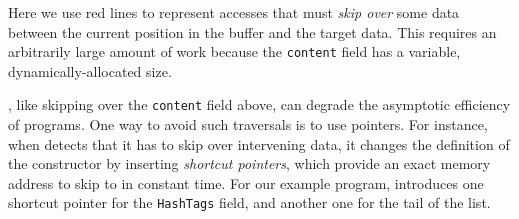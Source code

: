 


%
Here we use red lines to represent accesses that must \emph{skip over} some data
between the current position in the buffer and the target data. 
%
This  requires an arbitrarily large amount of work because
the \lstinline|content| field has a variable, dynamically-allocated size. 


%
, like skipping over the \lstinline|content| field above,
can degrade the asymptotic efficiency of programs.
%
One way to avoid such traversals is to use pointers.
%
For instance, when \gibbon detects that it has to skip over intervening data, it
changes the definition of the constructor by inserting \emph{shortcut pointers},
which provide an exact memory address to skip to in constant time.
%
For our example program, \gibbon{} introduces one shortcut
pointer for the \lstinline|HashTags| field, and another one for the tail of the list.
%

